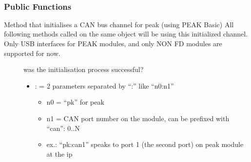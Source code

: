 \documentclass[letterpaper,10pt,english]{sphinxmanual}
\begin{document}
\begin{fulllineitems}
\label{\detokenize{vendors/peak:_CPPv49PKCanScan}}%
\pysigstartmultiline
{}\label{\detokenize{vendors/peak:classPKCanScan}}%
\pysigstopmultiline~\subsubsection*{Public Functions}

\begin{fulllineitems}
\label{\detokenize{vendors/peak:_CPPv4N9PKCanScan9createBusEK6stringK6string}}%
\pysigstartmultiline
{}\label{\detokenize{vendors/peak:classPKCanScan_1ae91999b9316ca127eecbabd9f27c3137}}%
\pysigstopmultiline
Method that initialises a CAN bus channel for peak (using PEAK Basic) All following methods called on the same object will be using this initialized channel. Only USB interfaces for PEAK modules, and only NON FD modules are supported for now.

\begin{description}
\item[{}] \leavevmode
was the initialisation process successful? 

\item[{}] \leavevmode\begin{itemize}
\item {} 
: = 2 parameters separated by “:” like “n0:n1”\begin{itemize}
\item {} 
n0 = “pk” for peak

\item {} 
n1 = CAN port number on the module, can be prefixed with “can”: 0..N

\item {} 
ex.: “pk:can1” speaks to port 1 (the second port) on peak module at the ip


\end{itemize}
\end{itemize}
\end{description}
\end{fulllineitems}
\end{fulllineitems}
\end{document}
